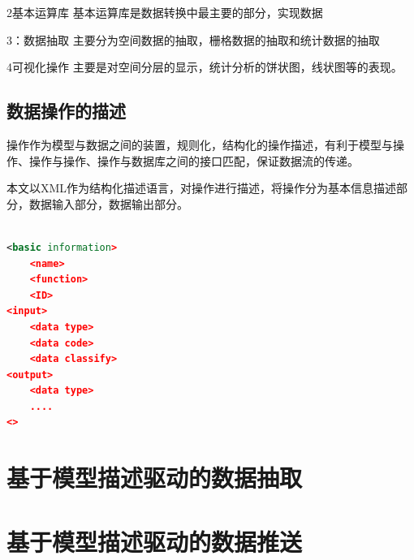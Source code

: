 \documentclass[master]{njnuthesis}
\begin{document}
2基本运算库
基本运算库是数据转换中最主要的部分，实现数据

3：数据抽取
主要分为空间数据的抽取，栅格数据的抽取和统计数据的抽取

4可视化操作
主要是对空间分层的显示，统计分析的饼状图，线状图等的表现。


\subsection{数据操作的描述}
操作作为模型与数据之间的装置，规则化，结构化的操作描述，有利于模型与操作、操作与操作、操作与数据库之间的接口匹配，保证数据流的传递。

本文以XML作为结构化描述语言，对操作进行描述，将操作分为基本信息描述部分，数据输入部分，数据输出部分。
\begin{center}
\begin{lstlisting}[language=xml]

<basic information>
	<name>
	<function>
	<ID>
<input>
	<data type>
	<data code>
	<data classify>
<output>
	<data type>
	....
<>

\end{lstlisting}
\end{center}


\section{基于模型描述驱动的数据抽取}


\section{基于模型描述驱动的数据推送}
\end{document}
